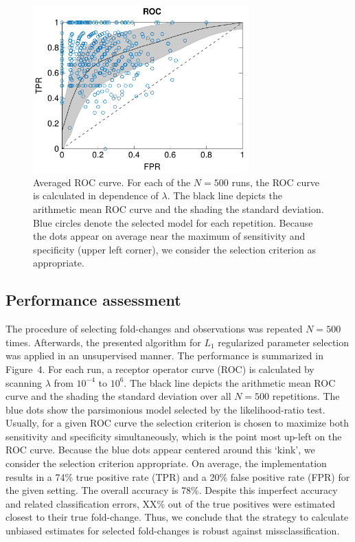 \documentclass{bioinfo}
\begin{document}
\begin{figure}[!tpb]%
\centerline{\includegraphics[width=235pt]{Figures/ROC.pdf}}
\caption{Averaged ROC curve. For each of the $N = 500$ runs, the ROC curve is calculated in dependence of $\lambda$. The black line depicts the arithmetic mean ROC curve and the shading the standard deviation. Blue circles denote the selected model for each repetition. Because the dots appear on average near the maximum of sensitivity and specificity (upper left corner), we consider the selection criterion as appropriate.}\label{fig:04}
\end{figure}

\subsection{Performance assessment}
The procedure of selecting fold-changes and observations was repeated $N=500$ times. %
Afterwards, the presented algorithm for $L_1$ regularized parameter selection was applied in an unsupervised manner.
The performance is summarized in Figure~4\vphantom{\ref{fig:04}}.
For each run, a receptor operator curve (ROC) is calculated by scanning $\lambda$ from $10^{-4}$ to $10^6$.
The black line depicts the arithmetic mean ROC curve and the shading the standard deviation over all $N=500$ repetitions.
The blue dots show the parsimonious model selected by the likelihood-ratio test.
Usually, for a given ROC curve the selection criterion is chosen to maximize both sensitivity and specificity simultaneously, which is the point most up-left on the ROC curve.
Because the blue dots appear centered around this `kink', we consider the selection criterion appropriate.
On average, the implementation results in a 74\% true positive rate (TPR) and a 20\% false positive rate (FPR) for the given setting.
The overall accuracy is 78\%.
Despite this imperfect accuracy and related classification errors, XX\% out of the true positives were estimated closest to their true fold-change.
Thus, we conclude that the strategy to calculate unbiased estimates for selected fold-changes is robust against missclassification.
\end{document}
